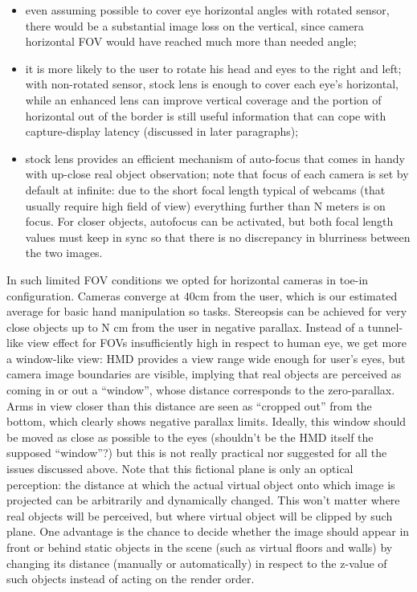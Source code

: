 \begin{itemize}
\item even assuming possible to cover eye horizontal angles with rotated sensor, there would be a substantial image loss on the vertical, since camera horizontal FOV would have reached much more than needed angle;
\item it is more likely to the user to rotate his head and eyes to the right and left; with non-rotated sensor, stock lens is enough to cover each eye’s horizontal, while an enhanced lens can improve vertical coverage and the portion of horizontal out of the border is still useful information that can cope with capture-display latency (discussed in later paragraphs);
\item stock lens provides an efficient mechanism of auto-focus that comes in handy with up-close real object observation; note that focus of each camera is set by default at infinite: due to the short focal length typical of webcams (that usually require high field of view) everything further than N meters is on focus. For closer objects, autofocus can be activated, but both focal length values must keep in sync so that there is no discrepancy in blurriness between the two images.
\end{itemize}
In such limited FOV conditions we opted for horizontal cameras in toe-in configuration. Cameras converge at 40cm from the user, which is our estimated average for basic hand manipulation so tasks. Stereopsis can be achieved for very close objects up to N cm from the user in negative parallax. Instead of a tunnel-like view effect for FOVs insufficiently high in respect to human eye, we get more a window-like view: HMD provides a view range wide enough for user’s eyes, but camera image boundaries are visible, implying that real objects are perceived as coming in or out a “window”, whose distance corresponds to the zero-parallax. Arms in view closer than this distance are seen as “cropped out” from the bottom, which clearly shows negative parallax limits. Ideally, this window should be moved as close as possible to the eyes (shouldn't be the HMD itself the supposed “window”?) but this is not really practical nor suggested for all the issues discussed above. Note that this fictional plane is only an optical perception: the distance at which the actual virtual object onto which image is projected can be arbitrarily and dynamically changed. This won’t matter where real objects will be perceived, but where virtual object will be clipped by such plane. One advantage is the chance to decide whether the image should appear in front or behind static objects in the scene (such as virtual floors and walls) by changing its distance (manually or automatically) in respect to the z-value of such objects instead of acting on the render order.

